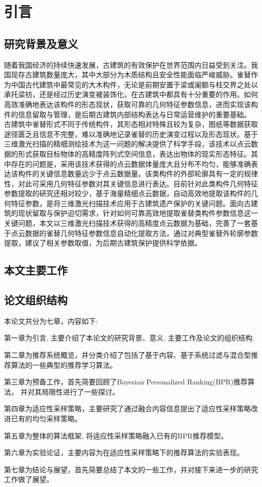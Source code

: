 \section{引言}

\subsection{研究背景及意义}

随着我国经济的持续快速发展，古建筑的有效保护在世界范围内日益受到关注。我国现存古建筑数量庞大，其中大部分为木质结构且安全性能面临严峻威胁。雀替作为中国古代建筑中最常见的大木构件，无论是前期安置于梁或阑额与柱交界之处以承托梁枋，还是经过历史演变被装饰化，在古建筑中都具有十分重要的作用。如何高效准确地表达该构件的形态现状，获取可靠的几何特征参数信息，进而实现该构件的信息留取与管理，是后期古建筑内部结构表达与日常运营维护的重要基础。
古建筑中雀替形式不同于传统构件，其形态相对特殊且较为复杂，图纸等数据获取途径匮乏且信息不完整，难以准确地记录雀替的历史演变过程以及形态现状。基于三维激光扫描的精细测绘技术为这一问题的解决提供了科学手段，该技术以点云数据的形式获取目标物体的高精度阵列式空间信息，表达出物体的现实形态特征。其中存在的问题是，采用该技术获得的点云数据体量庞大且分布不均匀，能够准确表达该构件的关键信息数量远少于点云数据量。该类构件的外部轮廓具有一定的规律性，对此可采用几何特征参数对其关键信息进行表达。目前针对此类构件几何特征参数提取的研究还相对较少，基于海量精细点云数据，自动高效地提取该构件的几何特征参数，是将三维激光扫描技术应用于古建筑遗产保护的关键问题。面向古建筑的现状留取与保护迫切需求，针对如何可靠高效地提取雀替类构件参数信息这一关键问题，本文以三维激光扫描技术获得的高精度点云数据为基础，完善了一套基于点云数据的雀替几何特征参数信息自动化提取方法，通过对典型雀替外轮廓参数提取，建议了相关参数取值，为后期古建筑保护提供科学依据。\cite{TDBZ202407002}

\subsection{本文主要工作}




\subsection{论文组织结构}

 本论文共分为七章，内容如下: 

 第一章为引言, 主要介绍了本论文的研究背景、意义, 主要工作及论文的组织结构.
 
 第二章为推荐系统概览，并分类介绍了包括了基于内容、基于系统过滤与混合型推荐算法的一些典型的推荐学习算法。
 
 第三章为预备工作，首先简要回顾了Bayesian Personalized Ranking(BPR)推荐算法， 并对其局限性进行了一些探讨。
 
 第四章为适应性采样策略，主要研究了通过融合内容信息提出了适应性采样策略改进已有的均匀采样策略。
 
 第五章为整体的算法框架, 将适应性采样策略融入已有的BPR推荐模型。
 
 第六章为实验论证，主要内容为在适应性采样策略下的推荐算法的实验表现。
 
 第七章为结论与展望，首先简要总结了本文的一些工作，并对接下来进一步的研究工作做了展望。
